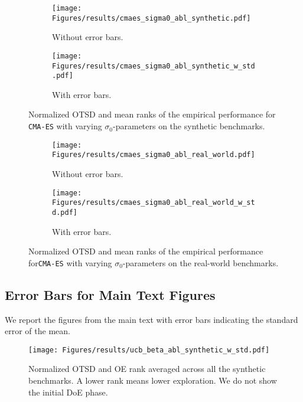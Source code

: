 \documentclass[accepted]{uai2025}
\begin{document}
\begin{figure}[H]
    \centering
    \begin{subfigure}{0.48\linewidth}
    \texttt{[image: Figures/results/cmaes\_sigma0\_abl\_synthetic.pdf]}
    \caption{Without error bars.}
    \end{subfigure}
    \begin{subfigure}{0.48\linewidth}
    \texttt{[image: Figures/results/cmaes\_sigma0\_abl\_synthetic\_w\_std.pdf]}
    \caption{With error bars.}
    \end{subfigure}
    \caption{Normalized OTSD and mean ranks of the empirical performance for \texttt{CMA-ES} with varying $\sigma_0$-parameters on the synthetic benchmarks.}
    \label{fig:abl_cmaes_synthetic}
\end{figure}

\begin{figure}[H]
    \centering
    \begin{subfigure}{0.48\linewidth}
    \texttt{[image: Figures/results/cmaes\_sigma0\_abl\_real\_world.pdf]}
    \caption{Without error bars.}
    \end{subfigure}
    \begin{subfigure}{0.48\linewidth}
    \texttt{[image: Figures/results/cmaes\_sigma0\_abl\_real\_world\_w\_std.pdf]}
    \caption{With error bars.}
    \end{subfigure}
    \caption{Normalized OTSD and mean ranks of the empirical performance for\texttt{CMA-ES} with varying $\sigma_0$-parameters on the real-world benchmarks.}
    \label{fig:abl_cmaes_rw}
\end{figure}

\subsection{Error Bars for Main Text Figures}
\label{app:error_bars}

We report the figures from the main text with error bars indicating the standard error of the mean.

\begin{figure}[H]
    \centering
    \texttt{[image: Figures/results/ucb\_beta\_abl\_synthetic\_w\_std.pdf]}
    \caption{Normalized \ac{OTSD} and \ac{OE} rank averaged across all the synthetic benchmarks. A lower rank means lower exploration. We do not show the initial \acl{DoE} phase.}
\end{figure}
\end{document}
